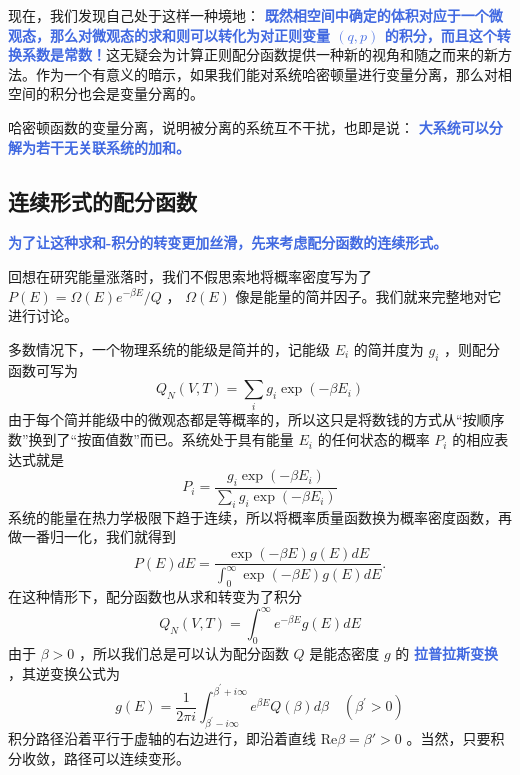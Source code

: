 \documentclass[hyperref,UTF-8]{ctexbook}
\newcommand{\0}{\boldsymbol{0}}
\begin{document}
现在，我们发现自己处于这样一种境地： \textcolor{RoyalBlue}{\textbf{\kaishu 既然相空间中确定的体积对应于一个微观态，那么对微观态的求和则可以转化为对正则变量 $(q,p)$ 的积分，而且这个转换系数是常数！}}这无疑会为计算正则配分函数提供一种新的视角和随之而来的新方法。作为一个有意义的暗示，如果我们能对系统哈密顿量进行变量分离，那么对相空间的积分也会是变量分离的。

哈密顿函数的变量分离，说明被分离的系统互不干扰，也即是说： \textcolor{RoyalBlue}{\textbf{\kaishu 大系统可以分解为若干无关联系统的加和。}} 

\subsection{连续形式的配分函数}
\textcolor{RoyalBlue}{\textbf{\kaishu 为了让这种求和-积分的转变更加丝滑，先来考虑配分函数的连续形式。}}

回想在研究能量涨落时，我们不假思索地将概率密度写为了 $P(E) = \Omega(E)e^{-\beta E}/Q$ ， $\Omega(E)$ 像是能量的简并因子。我们就来完整地对它进行讨论。

多数情况下，一个物理系统的能级是简并的，记能级 $E_i$ 的简并度为 $g_i$ ，则配分函数可写为
\begin{equation}
    Q_N(V, T)=\sum_i g_i \exp \left(-\beta E_i\right)
\end{equation}
由于每个简并能级中的微观态都是等概率的，所以这只是将数钱的方式从“按顺序数”换到了“按面值数”而已。系统处于具有能量 $E_i$ 的任何状态的概率 $P_i$ 的相应表达式就是
\begin{equation}
    P_i=\frac{g_i \exp \left(-\beta E_i\right)}{\sum_i g_i \exp \left(-\beta E_i\right)}
\end{equation}
系统的能量在热力学极限下趋于连续，所以将概率质量函数换为概率密度函数，再做一番归一化，我们就得到
\begin{equation}
    P(E) d E=\frac{\exp (-\beta E) g(E) d E}{\int_0^{\infty} \exp (-\beta E) g(E) d E} .
\end{equation}
在这种情形下，配分函数也从求和转变为了积分
\begin{equation}
    Q_N(V, T)=\int_0^{\infty} e^{-\beta E} g(E) d E
\end{equation}
由于 $\beta>0$ ，所以我们总是可以认为配分函数 $Q$ 是能态密度 $g$ 的 \textcolor{RoyalBlue}{\textbf{\kaishu 拉普拉斯变换}} ，其逆变换公式为
\begin{equation}
    g(E)=\frac{1}{2 \pi i} \int_{\beta^{\prime}-i \infty}^{\beta^{\prime}+i \infty} e^{\beta E} Q(\beta) d \beta \quad\left(\beta^{\prime}>0\right)
\end{equation}
积分路径沿着平行于虚轴的右边进行，即沿着直线 $\text{Re}\beta = \beta' >0$ 。当然，只要积分收敛，路径可以连续变形。
\end{document}

